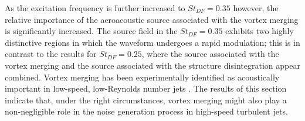 As the excitation frequency is further increased to $St_{DF} = 0.35$ however, the relative importance of the aeroacoustic source associated with the vortex merging is significantly increased.
The source field in the $St_{DF} = 0.35$ exhibits two highly distinctive regions in which the waveform undergoes a rapid modulation; this is in contrast to the results for $St_{DF} = 0.25$, where the source associated with the vortex merging and the source associated with the structure disintegration appear combined.
Vortex merging has been experimentally identified as acoustically important in low-speed, low-Reynolds number jets \citep{Kibens1980}.
The results of this section indicate that, under the right circumstances, vortex merging might also play a non-negligible role in the noise generation process in high-speed turbulent jets.